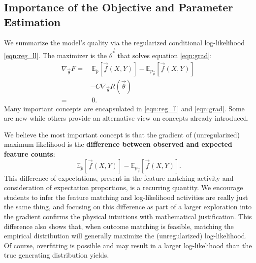 \documentclass[11pt,letterpaper]{article}
\newcommand{\empirical}[0]{\ensuremath{\tilde{p}}}
\begin{document}

\subsection{Importance of the Objective and Parameter Estimation} %

We summarize the model's quality via the regularized conditional
log-likelihood \eqref{eqn:reg_ll}.  
The maximizer is the $\vec{\theta^*}$ that solves equation \eqref{eqn:grad}:
\begin{equation}
\begin{aligned}
\nabla_{\vec{\theta}} F
 = &
\ \mathbb{E}_{\empirical{}}\left[\vec{f}(X,Y)\right] 
- \mathbb{E}_{{p_{\vec{\theta}}}}\left[\vec{f}(X,Y)\right]\\
 & - C \nabla_{\vec{\theta}}R(\vec{\theta})
\label{eqn:grad} \\
 = &\ 0.
\end{aligned}
\end{equation}
Many important concepts are encapsulated in \eqref{eqn:reg_ll} and \eqref{eqn:grad}. 
Some are new while others provide an alternative view
on concepts already introduced. 

We believe the most important concept is that the gradient of (unregularized)
maximum likelihood is the \textbf{difference 
between observed and expected feature counts}:
\begin{equation}
\ \mathbb{E}_{\empirical{}}\left[\vec{f}(X,Y)\right] 
- \mathbb{E}_{p_{\vec{\theta}}}\left[\vec{f}(X,Y)\right].
\label{eqn:obsexp} 
\end{equation}
This difference of expectations, present in the feature matching activity and consideration of expectation 
proportions, is a recurring quantity. We encourage students to infer the feature 
matching and log-likelihood activities are really just the same thing, and focusing on this difference as part 
of a larger exploration into the gradient confirms the physical intuitions with mathematical justification.
This difference also shows that, when outcome matching is feasible, matching the empirical 
distribution will generally maximize the (unregularized) log-likelihood. Of course, overfitting is possible and 
may result in a larger log-likelihood than the true generating distribution yields.
\end{document}
